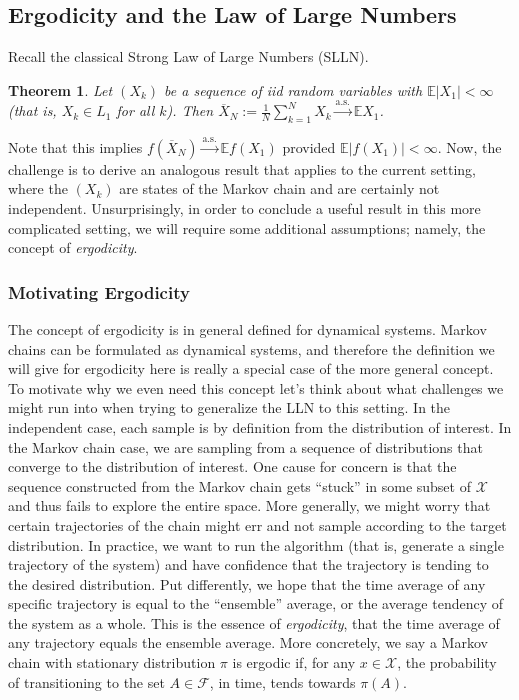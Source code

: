 \documentclass[12pt]{article}
\newcommand*{\abs}[1]{\left\lvert#1\right\rvert}
\newcommand{\E}{\mathbb{E}}
\newtheorem{thm}{Theorem}
\begin{document}
\subsection{Ergodicity and the Law of Large Numbers}
Recall the classical Strong Law of Large Numbers (SLLN). 
\begin{thm}
Let $(X_k)$ be a sequence of iid random variables with $\E \abs{X_1} < \infty$ (that is, $X_k \in L_1$ for all $k$). Then 
$\overline{X}_N := \frac{1}{N} \sum_{k = 1}^{N} X_k \overset{\text{a.s.}}{\to} \E X_1$. 
\end{thm} 
Note that this implies $f(\overline{X}_N) \overset{\text{a.s.}}{\to} \E f(X_1)$ provided $\E \abs{f(X_1)} < \infty$. Now, the challenge is to derive an analogous result
that applies to the current setting, where the $(X_k)$ are states of the Markov chain and are certainly not independent. Unsurprisingly, in order to conclude a useful result
in this more complicated setting, we will require some additional assumptions; namely, the concept of \textit{ergodicity}. 

\subsubsection{Motivating Ergodicity}
The concept of ergodicity is in general defined for dynamical systems. Markov chains can be formulated as dynamical systems, and therefore the definition we will
give for ergodicity here is really a special case of the more general concept. To motivate why we even need this concept let's think about what challenges we might 
run into when trying to generalize the LLN to this setting. In the independent case, each sample is by definition from the distribution of interest. In the Markov chain case, 
we are sampling from a sequence of distributions that converge to the distribution of interest. One cause for concern is that the sequence constructed from the Markov chain 
gets ``stuck'' in some subset of $\mathcal{X}$ and thus fails to explore the entire space. More generally, we might worry that certain trajectories of the chain might err and 
not sample according to the target distribution. In practice, we want to run the algorithm (that is, generate a single trajectory of the system) and have confidence that the trajectory 
is tending to the desired distribution. Put differently, we hope that the time average of any specific trajectory is equal to the ``ensemble'' average, or the average tendency of the system
as a whole. This is the essence of \textit{ergodicity}, that the time average of any trajectory equals the ensemble average. More concretely, we say a Markov chain with stationary 
distribution $\pi$ is ergodic if, for any $x \in \mathcal{X}$, the probability of transitioning to the set $A \in \mathcal{F}$, in time, tends towards $\pi(A)$. 
\end{document}
